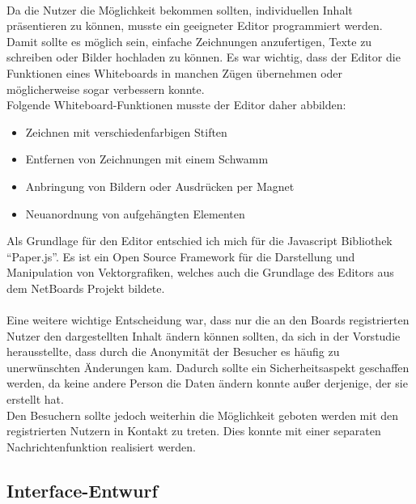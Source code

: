 \\
Da die Nutzer die Möglichkeit bekommen sollten, individuellen Inhalt präsentieren zu können, musste ein geeigneter Editor programmiert werden.
Damit sollte es möglich sein, einfache Zeichnungen anzufertigen, Texte zu schreiben oder Bilder hochladen zu können.
Es war wichtig, dass der Editor die Funktionen eines Whiteboards in manchen Zügen übernehmen oder möglicherweise sogar verbessern konnte.
\\
Folgende Whiteboard-Funktionen musste der Editor daher abbilden:
\begin{itemize}
  \item Zeichnen mit verschiedenfarbigen Stiften
  \item Entfernen von Zeichnungen mit einem Schwamm
  \item Anbringung von Bildern oder Ausdrücken per Magnet
  \item Neuanordnung von aufgehängten Elementen
\end{itemize}
Als Grundlage für den Editor entschied ich mich für die Javascript Bibliothek ``Paper.js''\cite{paperjs:website}.
Es ist ein Open Source Framework für die Darstellung und Manipulation von Vektorgrafiken, welches auch die Grundlage des Editors aus dem NetBoards Projekt bildete\cite{wood:2014}.
\\
\\
Eine weitere wichtige Entscheidung war, dass nur die an den Boards registrierten Nutzer den dargestellten Inhalt ändern können sollten, da sich in der Vorstudie herausstellte, dass durch die Anonymität der Besucher es häufig zu unerwünschten Änderungen kam.
Dadurch sollte ein Sicherheitsaspekt geschaffen werden, da keine andere Person die Daten ändern konnte außer derjenige, der sie erstellt hat.
\\
Den Besuchern sollte jedoch weiterhin die Möglichkeit geboten werden mit den registrierten Nutzern in Kontakt zu treten. Dies konnte mit einer separaten Nachrichtenfunktion realisiert werden.











\subsection{Interface-Entwurf}\label{Interface-Entwurf}
